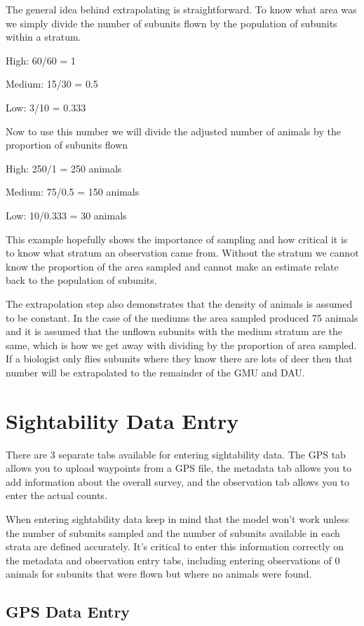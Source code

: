 \documentclass[
]{book}
\begin{document}
The general idea behind extrapolating is straightforward. To know what area was we simply divide the number of subunits flown by the population of subunits within a stratum.

High: 60/60 = 1

Medium: 15/30 = 0.5

Low: 3/10 = 0.333

Now to use this number we will divide the adjusted number of animals by the proportion of subunits flown

High: 250/1 = 250 animals

Medium: 75/0.5 = 150 animals

Low: 10/0.333 = 30 animals

This example hopefully shows the importance of sampling and how critical it is to know what stratum an observation came from. Without the stratum we cannot know the proportion of the area sampled and cannot make an estimate relate back to the population of subunits.

The extrapolation step also demonstrates that the density of animals is assumed to be constant. In the case of the mediums the area sampled produced 75 animals and it is assumed that the unflown subunits with the medium stratum are the same, which is how we get away with dividing by the proportion of area sampled. If a biologist only flies subunits where they know there are lots of deer then that number will be extrapolated to the remainder of the GMU and DAU.

\hypertarget{sight-de}{%
\section{Sightability Data Entry}\label{sight-de}}

There are 3 separate tabs available for entering sightability data. The GPS tab allows you to upload waypoints from a GPS file, the metadata tab allows you to add information about the overall survey, and the observation tab allows you to enter the actual counts.

When entering sightability data keep in mind that the model won't work unless the number of subunits sampled and the number of subunits available in each strata are defined accurately. It's critical to enter this information correctly on the metadata and observation entry tabs, including entering observations of 0 animals for subunits that were flown but where no animals were found.

\hypertarget{gps-data-entry}{%
\subsection{GPS Data Entry}\label{gps-data-entry}}
\end{document}
